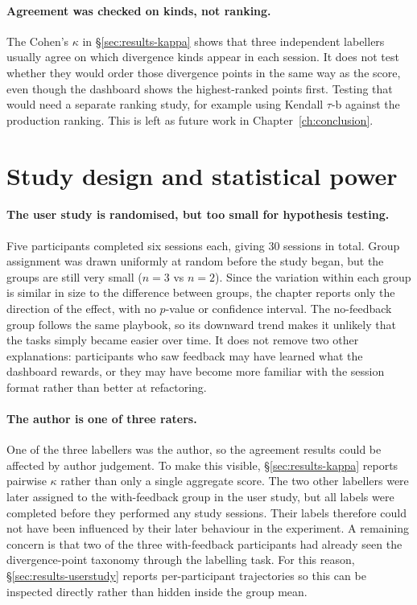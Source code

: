 \paragraph{Agreement was checked on kinds, not ranking.}
The Cohen's $\kappa$ in \S\ref{sec:results-kappa} shows that three independent labellers usually agree on which divergence kinds appear in each session. It does not test whether they would order those divergence points in the same way as the score, even though the dashboard shows the highest-ranked points first. Testing that would need a separate ranking study, for example using Kendall $\tau$-b against the production ranking. This is left as future work in Chapter~\ref{ch:conclusion}.

\section{Study design and statistical power}
\label{sec:threats-study-design}

\paragraph{The user study is randomised, but too small for hypothesis testing.}
Five participants completed six sessions each, giving $30$ sessions in total. Group assignment was drawn uniformly at random before the study began, but the groups are still very small ($n = 3$ vs $n = 2$). Since the variation within each group is similar in size to the difference between groups, the chapter reports only the direction of the effect, with no $p$-value or confidence interval. The no-feedback group follows the same playbook, so its downward trend makes it unlikely that the tasks simply became easier over time. It does not remove two other explanations: participants who saw feedback may have learned what the dashboard rewards, or they may have become more familiar with the session format rather than better at refactoring.

\paragraph{The author is one of three raters.}
One of the three labellers was the author, so the agreement results could be affected by author judgement. To make this visible, \S\ref{sec:results-kappa} reports pairwise $\kappa$ rather than only a single aggregate score. The two other labellers were later assigned to the with-feedback group in the user study, but all labels were completed before they performed any study sessions. Their labels therefore could not have been influenced by their later behaviour in the experiment. A remaining concern is that two of the three with-feedback participants had already seen the divergence-point taxonomy through the labelling task. For this reason, \S\ref{sec:results-userstudy} reports per-participant trajectories so this can be inspected directly rather than hidden inside the group mean.

